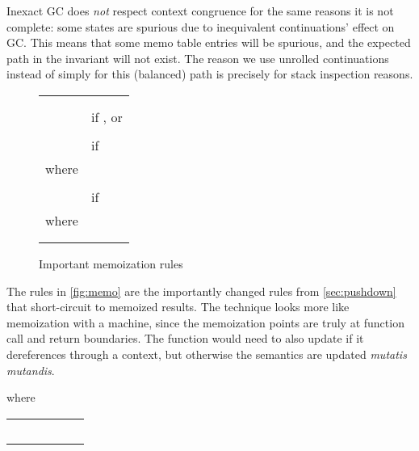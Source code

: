 Inexact GC does \emph{not} respect context congruence for the same reasons it is not complete: some states are spurious due to inequivalent continuations' effect on GC.
This means that some memo table entries will be spurious, and the expected path in the invariant will not exist.
The reason we use unrolled continuations instead of simply  for this (balanced) path is precisely for stack inspection reasons.

 \begin{figure}
   \begin{center}
     
     \begin{tabular}{r|l}
       \hline\vspace{-3mm}\\
       
       &
        \\
       & \quad if , or \\
       &
        \\
       & \quad if  \\
       where &  \\
       & 
       \\
       
       &
        if  \\
       where &  \\
       &  \\
       & 
     \end{tabular}
   \end{center}
   \caption{Important memoization rules}
   \label{fig:memo}
 \end{figure}

The rules in \autoref{fig:memo} are the importantly changed rules from \autoref{sec:pushdown} that short-circuit to memoized results.
The technique looks more like memoization with a  machine, since the memoization points are truly at function call and return boundaries.
The  function would need to also update  if it dereferences through a context, but otherwise the semantics are updated \emph{mutatis mutandis}.



where

\begin{tabular}{rlrlrl}
   &
  \multicolumn{5}{l}{
    \hspace{-3mm}}
\\
    &\hspace{-3mm} &  & \hspace{-3mm} &  & \hspace{-3mm} \\
    &\hspace{-3mm} &  & \hspace{-3mm} & & \\
    &
   \multicolumn{5}{l}{
     \hspace{-3mm}}
   \\ &\multicolumn{5}{l}{\hspace{-3mm}}
 \end{tabular}

